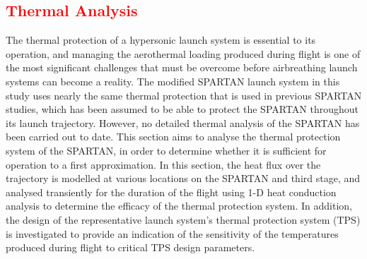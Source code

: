 
\textcolor{red}{
	\chapter{Thermal Analysis}
}


The thermal protection of a hypersonic launch system is essential to its operation, and managing the aerothermal loading produced during flight is one of the most significant challenges that must be overcome before airbreathing launch systems can become a reality. The modified SPARTAN launch system in this study uses nearly the same thermal protection that is used in previous SPARTAN studies, which has been assumed to be able to protect the SPARTAN throughout its launch trajectory\cite{Preller2018a}. However, no detailed thermal analysis of the SPARTAN has been carried out to date. This section aims to analyse the thermal protection system of the SPARTAN, in order to determine whether it is sufficient for operation to a first approximation. In this section, the heat flux over the trajectory is modelled at various locations on the SPARTAN and third stage, and analysed transiently for the duration of the flight using 1-D heat conduction analysis to determine the efficacy of the thermal protection system. In addition, the design of the representative launch system's thermal protection system (TPS) is investigated to provide an indication of the sensitivity of the temperatures produced during flight to critical TPS design parameters. 





